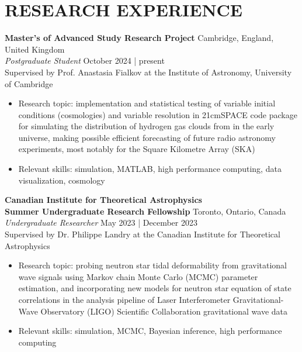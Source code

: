 \documentclass[a4paper,10pt]{extarticle}
\begin{document}
\section*{RESEARCH EXPERIENCE}
\textbf{Master's of Advanced Study Research Project} \hfill Cambridge, England, United Kingdom\\
\textit{Postgraduate Student} \hfill October 2024 | present\\
Supervised by Prof. Anastasia Fialkov at the Institute of Astronomy, University of Cambridge
\begin{itemize}
    \item Research topic: implementation and statistical testing of variable initial conditions (cosmologies) and variable resolution in 21cmSPACE code package for simulating the distribution of hydrogen gas clouds from in the early universe, making possible efficient forecasting of future radio astronomy experiments, most notably for the Square Kilometre Array (SKA)
    
    \item Relevant skills: simulation, MATLAB, high performance computing, data visualization, cosmology
\end{itemize}

\textbf{Canadian Institute for Theoretical Astrophysics\\
    Summer Undergraduate Research Fellowship} \hfill Toronto, Ontario, Canada\\
\textit{Undergraduate Researcher} \hfill May 2023 | December 2023\\
Supervised by Dr. Philippe Landry at the Canadian Institute for Theoretical Astrophysics
\begin{itemize}
    \item Research topic: probing neutron star tidal deformability from gravitational wave signals using Markov chain Monte Carlo (MCMC) parameter estimation, and incorporating new models for neutron star equation of state correlations in the analysis pipeline of Laser Interferometer Gravitational-Wave Observatory (LIGO) Scientific Collaboration gravitational wave data

    \item Relevant skills: simulation, MCMC, Bayesian inference, high performance computing
\end{itemize}
\end{document}
